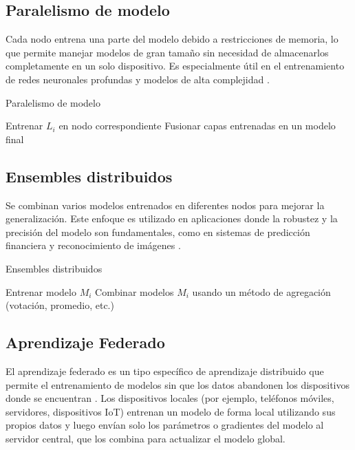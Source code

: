 \subsection{Paralelismo de modelo}
Cada nodo entrena una parte del modelo debido a restricciones de memoria, lo que permite manejar modelos de gran tamaño sin necesidad de almacenarlos completamente en un solo dispositivo. Es especialmente útil en el entrenamiento de redes neuronales profundas y modelos de alta complejidad \cite{dean2012large}.
\begin{algorithm}
	\caption{Paralelismo de modelo}
	\begin{algorithmic}[1]
		\State Entrenar $L_i$ en nodo correspondiente
		\EndFor
		\State Fusionar capas entrenadas en un modelo final
	\end{algorithmic}
\end{algorithm}

\subsection{Ensembles distribuidos}
Se combinan varios modelos entrenados en diferentes nodos para mejorar la generalización. Este enfoque es utilizado en aplicaciones donde la robustez y la precisión del modelo son fundamentales, como en sistemas de predicción financiera y reconocimiento de imágenes \cite{kairouz2021advances}.
\begin{algorithm}
	\caption{Ensembles distribuidos}
	\begin{algorithmic}[1]
		\State Entrenar modelo $M_i$
		\EndFor
		\State Combinar modelos $M_i$ usando un método de agregación (votación, promedio, etc.)
	\end{algorithmic}
\end{algorithm}


\subsection{Aprendizaje Federado}
El aprendizaje federado es un tipo específico de aprendizaje distribuido que permite el entrenamiento de modelos sin que los datos abandonen los dispositivos donde se encuentran \cite{mcmahan2017communication}. Los dispositivos locales (por ejemplo, teléfonos móviles, servidores, dispositivos IoT) entrenan un modelo de forma local utilizando sus propios datos y luego envían solo los parámetros o gradientes del modelo al servidor central, que los combina para actualizar el modelo global.


